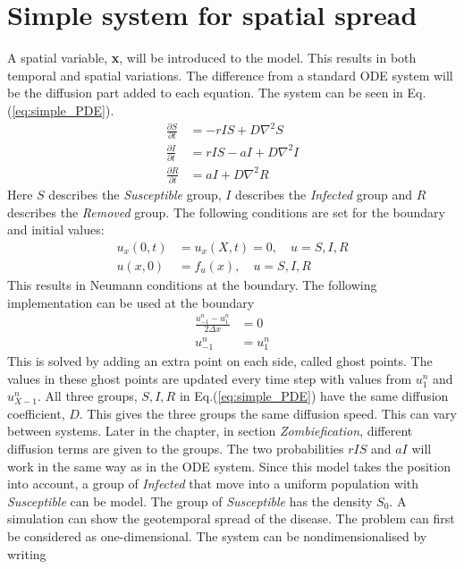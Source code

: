 \documentclass[%
twoside,                 %
final,                   %
chapterprefix=true,      %
open=right               %
10pt]{book}
\begin{document}
\section{Simple system for spatial spread}
A spatial variable, \textbf{x}, will be introduced to the model. This results in both temporal and spatial variations. The difference from a standard ODE system will be the diffusion part added to each equation. The system can be seen in Eq.(\ref{eq:simple_PDE}). 
\begin{equation} \label{eq:simple_PDE}
	\begin{aligned}
	\frac{\partial S}{\partial t} &= -rIS + D\nabla ^2 S\\
	\frac{\partial I}{\partial t} &= rIS- aI + D\nabla ^2 I\\
	\frac{\partial R}{\partial t} &= aI + D\nabla ^2 R
	\end{aligned}
\end{equation}
Here $S$ describes the \emph{Susceptible} group, $I$ describes the \emph{Infected} group and $R$ describes the \emph{Removed} group. The following conditions are set for the boundary and initial values:
\begin{equation} \label{eq:boundary_initial}
	\begin{aligned}
	u_x(0,t) &= u_x(X,t) = 0,\quad u = S,I,R\\
	u(x,0) &= f_u(x),\quad u= S,I,R
	\end{aligned}
\end{equation}
This results in Neumann conditions at the boundary. The following implementation can be used at the boundary
\begin{equation}
	\begin{aligned}
	\frac{u_{-1}^n - u_1^n}{2\Delta x} &= 0 \\
	u_{-1}^n &= u_1^n
	\end{aligned}
\end{equation}
This is solved by adding an extra point on each side, called ghost points. The values in these ghost points are updated every time step with values from $u_1^n$ and $u_{X-1}^n$. All three groups, $S,I,R$ in Eq.(\ref{eq:simple_PDE}) have the same diffusion coefficient, $D$. This gives the three groups the same diffusion speed. This can vary between systems. Later in the chapter, in section \emph{Zombiefication}, different diffusion terms are given to the groups. The two probabilities $rIS$ and $aI$ will work in the same way as in the ODE system. Since this model takes the position into account, a group of \emph{Infected} that move into a uniform population with \emph{Susceptible} can be model. The group of \emph{Susceptible} has the density $S_0$. A simulation can show the geotemporal spread of the disease. The problem can first be considered as one-dimensional. The system can be nondimensionalised by writing 
\end{document}

